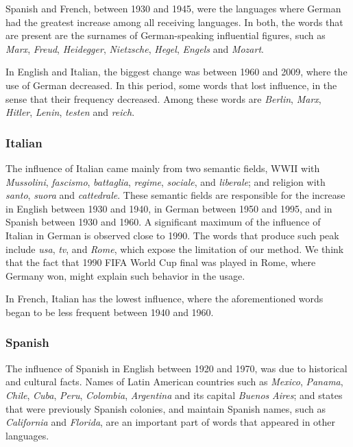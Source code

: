 \documentclass[10pt,letterpaper]{article} %
\begin{document}
Spanish and French,  between 1930 and 1945, were the languages where German had the greatest
increase among all receiving languages. 
In both, the words that are present are the surnames of German-speaking
influential figures, such as \textit{Marx},
\textit{Freud}, \textit{Heidegger}, \textit{Nietzsche}, \textit{Hegel},
\textit{Engels} and \textit{Mozart}.

In English and Italian, the biggest change was between 1960 and 2009, where the
use of German decreased. In this period, some words that lost influence, in the
sense that their frequency decreased. 
Among these words are 
\textit{Berlin}, \textit{Marx},
\textit{Hitler}, \textit{Lenin}, \textit{testen}  and \textit{reich}.
\subsubsection*{Italian} %


The influence of Italian came mainly from two semantic fields,  WWII with
\textit{Mussolini}, \textit{fascismo}, \textit{battaglia}, \textit{regime},
\textit{sociale}, and \textit{liberale}; and religion with \textit{santo},
\textit{suora} and \textit{cattedrale}. These semantic fields are
responsible for the increase in English between 1930 and 1940, in German
between 1950 and 1995, and in Spanish between 1930 and 1960.
A significant maximum of the influence of Italian in German is observed close to 1990. 
The words that produce such peak include 
\textit{usa},  \textit{tv}, and \textit{Rome}, which expose the limitation of our method. 
We think that the fact that 1990 FIFA World Cup final was played in Rome, where Germany won, might explain such behavior in the usage. 
% 

In French, Italian has the lowest influence, where the aforementioned words
began to be less frequent between 1940 and 1960.
\subsubsection*{Spanish} %

The influence of Spanish in English between 1920 and 1970, was due to
historical and cultural facts. Names of Latin American  countries such as
\textit{Mexico}, \textit{Panama}, \textit{Chile}, \textit{Cuba}, \textit{Peru},
\textit{Colombia}, \textit{Argentina} and its capital \textit{Buenos}
\textit{Aires};  and states that were previously Spanish colonies, and maintain Spanish names, such as \textit{California} and
\textit{Florida}, are an important part of words that appeared in 
other languages. 
\end{document}
